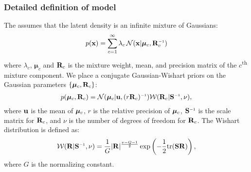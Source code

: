 \subsubsection{Detailed definition of model}

The \iwmm{} assumes that the latent density is an infinite mixture of Gaussians:
%
\begin{align}
p(\vx ) = \sum_{c=1}^{\infty} \lambda_c \, {\cal N}(\vx|\bm{\mu}_{c},\vR_{c}\inv)
\end{align}
%
where $\lambda_{c}$, $\bm{\mu}_{c}$ and $\mathbf{R}_{c}$ is the mixture weight, mean, and precision matrix of the $c$\textsuperscript{th} mixture component.
We place a conjugate Gaussian-Wishart priors on the Gaussian parameters $\{\bm{\mu}_{c},\mathbf{R}_{c}\}$:
%
\begin{align}
p(\bm{\mu}_{c},\vR_{c})
= {\cal N}(\bm{\mu}_{c}|\vu,(r\vR_{c})\inv)
{\cal W}(\vR_{c}|\vS\inv,\nu),
\label{eq:normal-wishar-prior}
\end{align}
%
where ${\bf{u}}$ is the mean of ${\boldsymbol{\mu}}_c$, $r$ is the relative precision of ${\boldsymbol{\mu}}_c$, $\vS\inv$ is the scale matrix for $\mathbf{R}_c$, and $\nu$ is the number of degrees of freedom for $\mathbf{R}_c$.
The Wishart distribution is defined as:
%
\begin{align}
{\cal W}(\vR|\vS\inv,\nu)=\frac{1}{G}|\vR|^{\frac{\nu-Q-1}{2}}\exp\left(-\frac{1}{2}{\rm tr}(\vS\vR)\right),
\end{align}
%
where $G$ is the normalizing constant.

